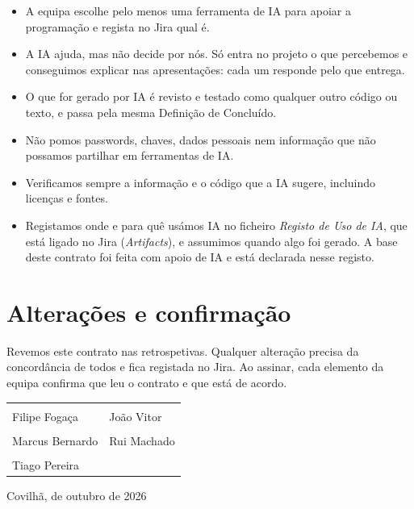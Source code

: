 \documentclass[11pt,a4paper]{article}
\begin{document}
\begin{itemize}
  \item A equipa escolhe pelo menos uma ferramenta de IA para apoiar a programação e regista no Jira qual é.
  \item A IA ajuda, mas não decide por nós. Só entra no projeto o que percebemos e conseguimos explicar nas apresentações: cada um responde pelo que entrega.
  \item O que for gerado por IA é revisto e testado como qualquer outro código ou texto, e passa pela mesma Definição de Concluído.
  \item Não pomos passwords, chaves, dados pessoais nem informação que não possamos partilhar em ferramentas de IA.
  \item Verificamos sempre a informação e o código que a IA sugere, incluindo licenças e fontes.
  \item Registamos onde e para quê usámos IA no ficheiro \textit{Registo de Uso de IA}, que está ligado no Jira (\textit{Artifacts}), e assumimos quando algo foi gerado. A base deste contrato foi feita com apoio de IA e está declarada nesse registo.
\end{itemize}

\section{Alterações e confirmação}

Revemos este contrato nas retrospetivas. Qualquer alteração precisa da concordância de todos e fica registada no Jira. Ao assinar, cada elemento da equipa confirma que leu o contrato e que está de acordo.

\vspace{0.4em}
\begin{tabularx}{\textwidth}{Y@{\hspace{1.4cm}}Y}
  \rule{0pt}{2.6em}\hrulefill & \rule{0pt}{2.6em}\hrulefill \\
  \small Filipe Fogaça & \small João Vitor \\
  \rule{0pt}{2.6em}\hrulefill & \rule{0pt}{2.6em}\hrulefill \\
  \small Marcus Bernardo & \small Rui Machado \\
  \rule{0pt}{2.6em}\hrulefill & \\
  \small Tiago Pereira & \\
\end{tabularx}

\vspace{1.5em}
Covilhã, \underline{\hspace{1cm}} de outubro de 2026
\end{document}
